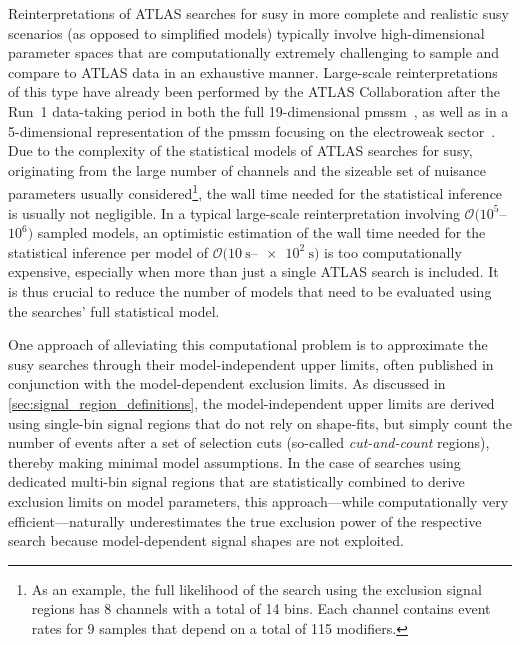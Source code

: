 Reinterpretations of ATLAS searches for \gls{susy} in more complete and realistic \gls{susy} scenarios (as opposed to simplified models) typically involve high-dimensional parameter spaces that are computationally extremely challenging to sample and compare to ATLAS data in an exhaustive manner.
Large-scale reinterpretations of this type have already been performed by the ATLAS Collaboration after the Run~1 data-taking period in both the full 19-dimensional \gls{pmssm}~\cite{pMSSM-scan-run1:2015baa}, as well as in a 5-dimensional representation of the \gls{pmssm} focusing on the electroweak sector~\cite{Aaboud:2016wna}.
Due to the complexity of the statistical models of ATLAS searches for \gls{susy}, originating from the large number of channels and the sizeable set of nuisance parameters usually considered\footnote{As an example, the full likelihood of the \onelepton search using the exclusion signal regions has 8 channels with a total of 14 bins. Each channel contains event rates for 9 samples that depend on a total of 115 modifiers.}, the wall time needed for the statistical inference is usually not negligible.
In a typical large-scale reinterpretation involving \mbox{$\mathcal{O}(10^5$--$10^6)$} sampled models, an optimistic estimation of the wall time needed for the statistical inference per model of \mbox{$\mathcal{O}(\SI{10}{\second}$--$\SI{e2}{\second})$} is too computationally expensive, especially when more than just a single ATLAS search is included.
It is thus crucial to reduce the number of models that need to be evaluated using the searches' full statistical model.

One approach of alleviating this computational problem is to approximate the \gls{susy} searches through their model-independent upper limits, often published in conjunction with the model-dependent exclusion limits.
As discussed in \cref{sec:signal_region_definitions}, the model-independent upper limits are derived using single-bin signal regions that do not rely on shape-fits, but simply count the number of events after a set of selection cuts (so-called \textit{cut-and-count} regions), thereby making minimal model assumptions.
In the case of searches using dedicated multi-bin signal regions that are statistically combined to derive exclusion limits on model parameters, this approach---while computationally very efficient---naturally underestimates the true exclusion power of the respective search because model-dependent signal shapes are not exploited.

